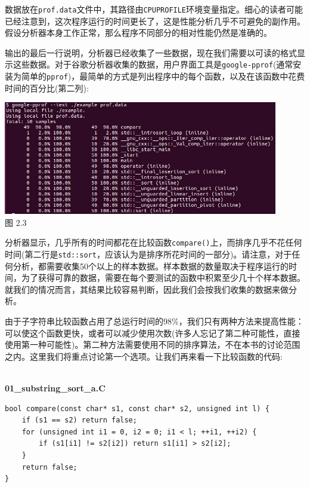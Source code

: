 数据放在\texttt{prof.data}文件中，其路径由\texttt{CPUPROFILE}环境变量指定。细心的读者可能已经注意到，这次程序运行的时间更长了，这是性能分析几乎不可避免的副作用。假设分析器本身工作正常，那么程序不同部分的相对性能仍然是准确的。

输出的最后一行说明，分析器已经收集了一些数据，现在我们需要以可读的格式显示这些数据。对于谷歌分析器收集的数据，用户界面工具是\texttt{google-pprof}(通常安装为简单的\texttt{pprof})，最简单的方式是列出程序中的每个函数，以及在该函数中花费时间的百分比(第二列):

\begin{center}
\includegraphics[width=0.9\textwidth]{content/1/chapter2/images/3.jpg}\\
图 2.3
\end{center}

分析器显示，几乎所有的时间都花在比较函数\texttt{compare()}上，而排序几乎不花任何时间(第二行是\texttt{std::sort}，应该认为是排序所花时间的一部分)。请注意，对于任何分析，都需要收集50个以上的样本数据。样本数据的数量取决于程序运行的时间，为了获得可靠的数据，需要在每个要测试的函数中积累至少几十个样本数据。就我们的情况而言，其结果比较容易判断，因此我们会按我们收集的数据来做分析。

由于子字符串比较函数占用了总运行时间的98\%，我们只有两种方法来提高性能：可以使这个函数更快，或者可以减少使用次数(许多人忘记了第二种可能性，直接使用第一种可能性)。第二种方法需要使用不同的排序算法，不在本书的讨论范围之内。这里我们将重点讨论第一个选项。让我们再来看一下比较函数的代码:

\hspace*{\fill} \\ %
\noindent
\textbf{01\_substring\_sort\_a.C}
\begin{lstlisting}[style=styleCXX]
bool compare(const char* s1, const char* s2, unsigned int l) {
	if (s1 == s2) return false;
	for (unsigned int i1 = 0, i2 = 0; i1 < l; ++i1, ++i2) {
		if (s1[i1] != s2[i2]) return s1[i1] > s2[i2];
	}
	return false;
}
\end{lstlisting}

